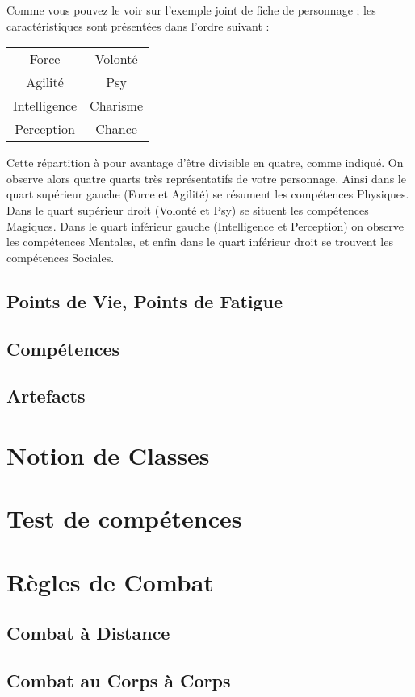 Comme vous pouvez le voir sur l’exemple joint de fiche de personnage ; les caractéristiques sont présentées dans l’ordre suivant :\\

    \begin{tabular}{c|c}
        Force &Volonté \\
        Agilité & Psy \\
        \hline
        Intelligence & Charisme\\
        Perception & Chance
    \end{tabular} 

Cette répartition à pour avantage d’être divisible en quatre, comme indiqué. On observe alors quatre quarts très représentatifs de votre personnage. Ainsi dans le quart supérieur gauche (Force et Agilité) se résument les compétences Physiques. Dans le quart supérieur droit (Volonté et Psy) se situent les compétences Magiques. Dans le quart inférieur gauche (Intelligence et Perception) on observe les compétences Mentales, et enfin dans le quart inférieur droit se trouvent les compétences Sociales.

\subsection{Points de Vie, Points de Fatigue}
\subsection{Compétences}
\subsection{Artefacts}
\section{Notion de Classes}
\section{Test de compétences}
\section{Règles de Combat}
\subsection{Combat à Distance}
\subsection{Combat au Corps à Corps}
